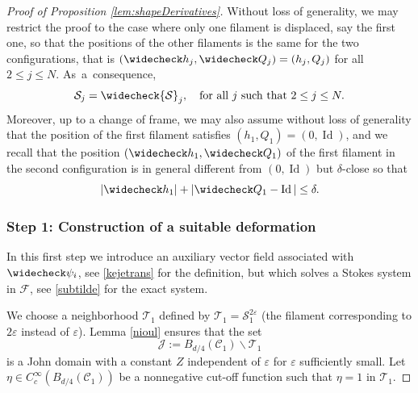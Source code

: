 \documentclass[10pt]{amsart}
\let\eps\varepsilon
\DeclareMathOperator{\Id}{Id}
\theoremstyle{definition}
\theoremstyle{remark}
\begin{document}
\begin{proof}[Proof of Proposition \ref{lem:shapeDerivatives}]
Without loss of generality, we may restrict the proof to the case where only one filament is displaced, say the first one, so that the positions of the other filaments is the same for the two configurations, that is $(\widecheck h_j, \widecheck Q_j) = (h_j,Q_j)$ for all $2 \leq j \leq N$. As~a~consequence,
\begin{equation}
\label{lezautre}
{\mathcal S}_j = \widecheck {\mathcal S}_j, \quad\text{for all $j$ such that } 2 \leq j \leq N.
\end{equation}
Moreover, up to a change of frame, we may also assume without loss of generality that the position of the first filament satisfies $(h_1,Q_1) = (0,\Id)$, and we recall that the position $(\widecheck h_1, \widecheck Q_1)$ of the first filament in the second configuration is in general different from $(0,\Id)$ but $\delta$-close so that
\begin{equation} \label{delta-c}
|\widecheck h_1 | + |\widecheck Q_1 - \Id | \leq \delta.
\end{equation}

\subsubsection*{Step 1: Construction of a suitable deformation}
In this first step we introduce an auxiliary vector field associated with $\widecheck \psi_i$, see \eqref{kejetrans} for the definition, but which solves a Stokes system in $\mathcal F$, see \eqref{subtilde} for the exact system.

We choose a neighborhood $\mathcal T_1$ defined by $\mathcal T_1 = \mathcal S_1^{2\eps}$ (\ie the filament corresponding to $2 \eps$ instead of $\eps$). Lemma \ref{nioul} ensures that the set
\begin{equation} \label{J}
\mathcal J := B_{d/4}(\mathcal C_1) \smallsetminus \mathcal T_1
\end{equation}
is a John domain with a constant $Z$ independent of $\eps$ for $\eps$ sufficiently small.
Let $\eta \in C_c^{\infty}(B_{d/4}(\mathcal C_1))$ be a nonnegative cut-off function such that
$\eta = 1$ in $\mathcal T_1$.


\end{proof}
\end{document}
